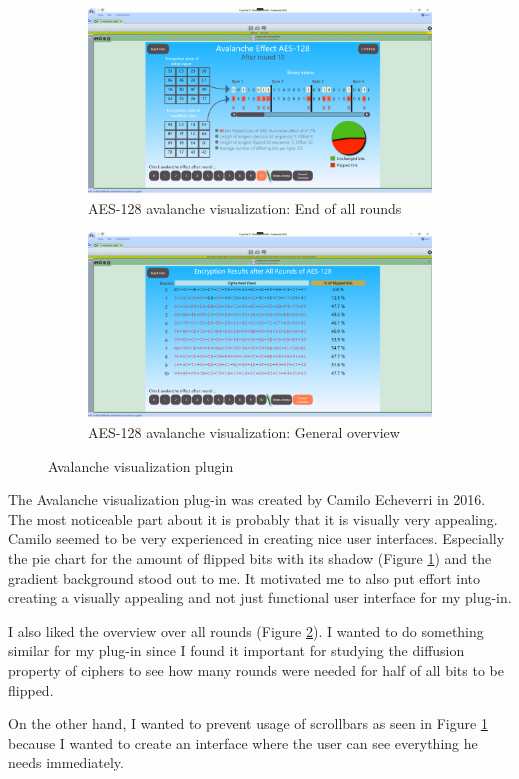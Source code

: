 \begin{figure}
\centering
\begin{subfigure}{\textwidth}
  \centering
  \includegraphics[width=\textwidth]{figures/ct2/avalanche.png}
  \caption{AES-128 avalanche visualization: End of all rounds}
  \label{fig:avalanche.roundsend}
\end{subfigure}
\begin{subfigure}{\textwidth}
  \centering
  \includegraphics[width=\textwidth]{figures/ct2/avalanche2.png}
  \caption{AES-128 avalanche visualization: General overview}
  \label{fig:avalanche.overview}
\end{subfigure}
\caption{Avalanche visualization plugin}
\label{fig:avalanche}
\end{figure}

The Avalanche visualization plug-in was created by Camilo Echeverri in 2016. The most noticeable part about it is probably that it is visually very appealing. Camilo seemed to be very experienced in creating nice user interfaces. Especially the pie chart for the amount of flipped bits with its shadow (Figure \ref{fig:avalanche.roundsend}) and the gradient background stood out to me. It motivated me to also put effort into creating a visually appealing and not just functional user interface for my plug-in.

I also liked the overview over all rounds (Figure \ref{fig:avalanche.overview}). I wanted to do something similar for my plug-in since I found it important for studying the diffusion property of ciphers to see how many rounds were needed for half of all bits to be flipped.

On the other hand, I wanted to prevent usage of scrollbars as seen in Figure \ref{fig:avalanche.roundsend} because I wanted to create an interface where the user can see everything he needs immediately.
